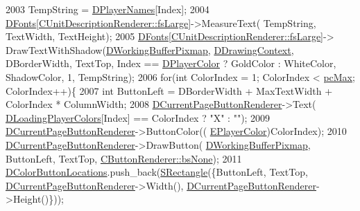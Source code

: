 \begin{DoxyCode}
2003         TempString = \hyperlink{classCApplicationData_a446d88c378b95b1a4f88071612229086}{DPlayerNames}[Index];
2004         \hyperlink{classCApplicationData_afde9247d0a3ea87393ec86dcdb1e8274}{DFonts}[\hyperlink{classCUnitDescriptionRenderer_a3ea4cd83b6dd9533ab3abb953a7da35aaf467097fe4f4811a5e2f1959c86e071d}{CUnitDescriptionRenderer::fsLarge}]->MeasureText(
      TempString, TextWidth, TextHeight);
2005         \hyperlink{classCApplicationData_afde9247d0a3ea87393ec86dcdb1e8274}{DFonts}[\hyperlink{classCUnitDescriptionRenderer_a3ea4cd83b6dd9533ab3abb953a7da35aaf467097fe4f4811a5e2f1959c86e071d}{CUnitDescriptionRenderer::fsLarge}]->
      DrawTextWithShadow(\hyperlink{classCApplicationData_afa34cf2780f38dd28c0c811e69d60a97}{DWorkingBufferPixmap}, \hyperlink{classCApplicationData_aa6c5bea9bdcc64398e5a3f693661d37c}{DDrawingContext}, DBorderWidth, TextTop, Index == 
      \hyperlink{classCApplicationData_a53550939b20cba70570f113e4d1c5d02}{DPlayerColor} ? GoldColor : WhiteColor, ShadowColor, 1, TempString);
2006         \textcolor{keywordflow}{for}(\textcolor{keywordtype}{int} ColorIndex = 1; ColorIndex < \hyperlink{GameDataTypes_8h_aafb0ca75933357ff28a6d7efbdd7602fa594a5c8dd3987f24e8a0f23f1a72cd34}{pcMax}; ColorIndex++)\{
2007             \textcolor{keywordtype}{int} ButtonLeft = DBorderWidth + MaxTextWidth + ColorIndex * ColumnWidth;
2008             \hyperlink{classCApplicationData_abfe1743f2634b069ccc811db4a8733a8}{DCurrentPageButtonRenderer}->Text(
      \hyperlink{classCApplicationData_ab29b80d90f1201608dcb498cd627a6f9}{DLoadingPlayerColors}[Index] == ColorIndex ? \textcolor{stringliteral}{"X"} : \textcolor{stringliteral}{""});
2009             \hyperlink{classCApplicationData_abfe1743f2634b069ccc811db4a8733a8}{DCurrentPageButtonRenderer}->ButtonColor((
      \hyperlink{GameDataTypes_8h_aafb0ca75933357ff28a6d7efbdd7602f}{EPlayerColor})ColorIndex);
2010             \hyperlink{classCApplicationData_abfe1743f2634b069ccc811db4a8733a8}{DCurrentPageButtonRenderer}->DrawButton(
      \hyperlink{classCApplicationData_afa34cf2780f38dd28c0c811e69d60a97}{DWorkingBufferPixmap}, ButtonLeft, TextTop, 
      \hyperlink{classCButtonRenderer_ae0eccda184600f6e14bfd59033e5e9a1aa0cd7277705307bef6c50f2250b5d62d}{CButtonRenderer::bsNone});
2011             \hyperlink{classCApplicationData_ac983034ed6e3eec382e22f1d2af25106}{DColorButtonLocations}.push\_back(\hyperlink{structSRectangle}{SRectangle}(\{ButtonLeft, TextTop,
       \hyperlink{classCApplicationData_abfe1743f2634b069ccc811db4a8733a8}{DCurrentPageButtonRenderer}->Width(), 
      \hyperlink{classCApplicationData_abfe1743f2634b069ccc811db4a8733a8}{DCurrentPageButtonRenderer}->Height()\}));

\end{DoxyCode}
